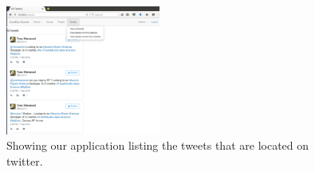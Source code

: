 \documentclass[letterpaper,10pt,onecolumn]{IEEEtran} %
\begin{document}
\begin{figure}[htp]
  \begin{center}
  
  \includegraphics[width=2in]{listingTweets}
  \centering
  \caption{Showing our application listing the tweets that are located on twitter. }

  \end{center}
\end{figure}
\end{document}
